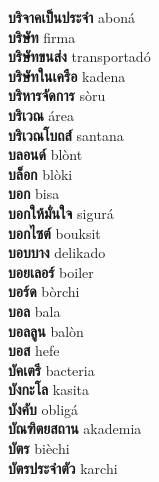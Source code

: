 \textbf{ บริจาคเป็นประจำ  } aboná \\
\textbf{ บริษัท  } firma \\
\textbf{ บริษัทขนส่ง  } transportadó \\
\textbf{ บริษัทในเครือ  } kadena \\
\textbf{ บริหารจัดการ  } sòru \\
\textbf{ บริเวณ  } área \\
\textbf{ บริเวณโบถส์  } santana \\
\textbf{ บลอนด์  } blònt \\
\textbf{ บล็อก  } blòki \\
\textbf{ บอก  } bisa \\
\textbf{ บอกให้มั่นใจ  } sigurá \\
\textbf{ บอกไซต์  } bouksit \\
\textbf{ บอบบาง  } delikado \\
\textbf{ บอยเลอร์  } boiler \\
\textbf{ บอร์ด  } bòrchi \\
\textbf{ บอล  } bala \\
\textbf{ บอลลูน  } balòn \\
\textbf{ บอส  } hefe \\
\textbf{ บัคเตรี  } bacteria \\
\textbf{ บังกะโล  } kasita \\
\textbf{ บังคับ  } obligá \\
\textbf{ บัณฑิตยสถาน  } akademia \\
\textbf{ บัตร  } bièchi \\
\textbf{ บัตรประจำตัว  } karchi \\
